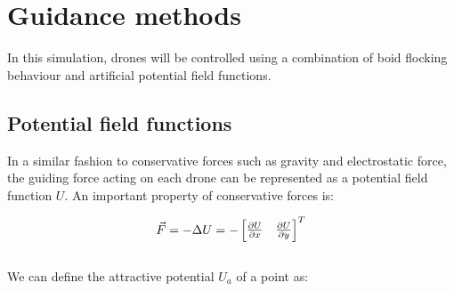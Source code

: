 

\section{Guidance methods}
In this simulation, drones will be controlled using a combination of boid flocking behaviour\cite{boid1} and artificial potential field functions\cite{con1}.

\subsection{Potential field functions}
In a similar fashion to conservative forces such as gravity and electrostatic force, the guiding force acting on each drone can be represented as a potential field function \textbf{\(U\)}. An important property of conservative forces is:

\begin{equation}
    \vec{F} = -\Delta U = -\begin{bmatrix}\pdv{U}{x} & \pdv{U}{y}\end{bmatrix}^T
    \label{equ:force}
\end{equation}
\\
We can define the attractive potential \(U_a\) of a point as:

